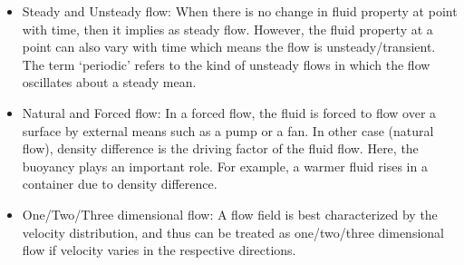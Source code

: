 \documentclass[a4paper,12pt]{report}
\begin{document}
{\begin{itemize}
\item Steady and Unsteady flow: When there is no change in fluid property at point with  time, then it implies as steady flow. However, the fluid property at a point can also  vary with time which means the flow is unsteady/transient. The term ‘periodic’ refers  to the kind of unsteady flows in which the flow oscillates about a steady mean. 
\item Natural and Forced flow: In a forced flow, the fluid is forced to flow over a surface by external means such as a pump or a fan. In other case (natural flow), density difference is the driving factor of the fluid flow. Here, the buoyancy plays an important role. For example, a warmer fluid rises in a container due to density difference. 
\item One/Two/Three dimensional flow: A flow field is best characterized by the velocity distribution, and thus can be treated as one/two/three dimensional flow if velocity varies in the respective directions.
\end{itemize}
}
\end{document}
